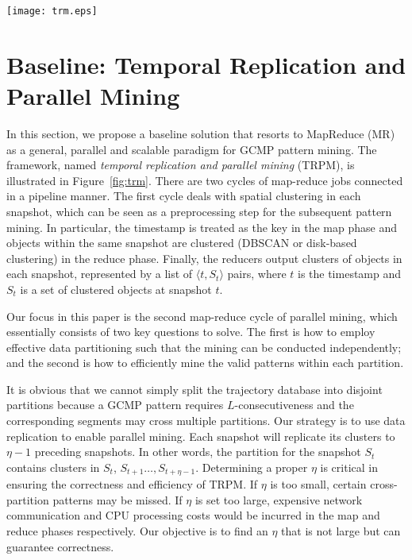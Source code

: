 

\begin{figure*} [t]
\center
\texttt{[image: trm.eps]}
\caption{Work flow of Temporal Replication and Parallel Mining. (a)(b) correspond to the first map-reduce cycle which clusters objects in each snapshot;  (c)(d) correspond to the second map-reduce cycle uses TRPM to detect GCMP in parallel.}
\label{fig:trm}
\end{figure*}

\section{Baseline: Temporal Replication and Parallel Mining}
\label{sec:trm}
In this section, we propose a baseline solution that resorts to MapReduce (MR) as a general, parallel and scalable paradigm for GCMP pattern mining. The framework, named \textit{temporal replication and parallel mining} (TRPM), is illustrated in   Figure~\ref{fig:trm}. There are two cycles of map-reduce jobs connected in a pipeline manner. The first cycle deals with spatial clustering in each snapshot, which can be seen as a preprocessing step for the subsequent pattern mining. In particular, the timestamp is treated as the key in the map phase and objects within the same snapshot are clustered (DBSCAN or disk-based clustering) in the reduce phase. Finally, the reducers output clusters of objects in each snapshot, represented by a list of $\langle t,S_t \rangle$ pairs, where $t$ is the timestamp and $S_t$ is a set of clustered objects at snapshot $t$. 

Our focus in this paper is the second map-reduce cycle of parallel mining, which essentially consists of two key questions to solve. The first is how to employ effective data partitioning such that the mining can be conducted independently; and the second is how to efficiently mine the valid patterns within each partition. 


It is obvious that we cannot simply split the trajectory database 
into disjoint partitions because a GCMP pattern requires $L$-consecutiveness 
and the corresponding segments may cross multiple partitions. 
Our strategy is to use data replication to enable parallel mining. 
Each snapshot will replicate its clusters to $\eta-1$ preceding snapshots.
In other words, the partition for the snapshot $S_t$ contains clusters 
in $S_t$, $S_{t+1}\ldots,S_{t+\eta-1}$. 
Determining a proper $\eta$ is critical in ensuring the
correctness and efficiency of TRPM. If $\eta$ is too small, 
certain cross-partition patterns may be missed. 
If $\eta$ is set too large, expensive network communication and 
CPU processing costs would be incurred in the map and reduce phases respectively. Our objective is to find an $\eta$ that is not large but can guarantee correctness.



